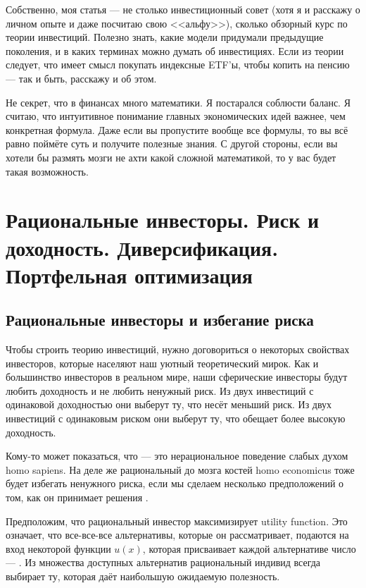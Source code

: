 Собственно, моя статья --- не столько инвестиционный совет (хотя я и расскажу о
личном опыте и даже посчитаю свою <<альфу>>), сколько обзорный курс по теории 
инвестиций. Полезно знать, какие модели придумали предыдущие поколения, и в 
каких терминах можно думать об инвестициях. Если из теории следует, что имеет 
смысл покупать индексные ETF'ы, чтобы копить на пенсию --- так и быть, расскажу 
и об этом.

Не секрет, что в финансах много математики. Я постарался соблюсти баланс. Я 
считаю, что интуитивное понимание главных экономических идей важнее, чем 
конкретная формула. Даже если вы пропустите вообще все формулы, то вы всё равно 
поймёте суть и получите полезные знания. С другой стороны, если вы хотели бы 
размять мозги не ахти какой сложной математикой, то у вас будет такая 
возможность.

\clearpage
\section{Рациональные инвесторы. Риск и доходность. Диверсификация. Портфельная
оптимизация}

\subsection{Рациональные инвесторы и избегание риска}

Чтобы строить теорию инвестиций, нужно договориться о некоторых свойствах 
инвесторов, которые населяют наш уютный теоретический мирок. Как и большинство 
инвесторов в реальном мире, наши сферические инвесторы будут любить доходность и 
не любить ненужный риск. Из двух инвестиций с одинаковой доходностью они выберут 
ту, что несёт меньший риск. Из двух инвестиций с одинаковым риском они выберут 
ту, что обещает более высокую доходность.

Кому-то может показаться, что  --- это
нерациональное поведение слабых духом homo sapiens. На деле же рациональный до
мозга костей homo economicus тоже будет избегать ненужного риска, если мы
сделаем несколько предположений о том, как он принимает решения
\cite[ch.~6.1]{bodie2014investments}.
 
Предположим, что рациональный инвестор максимизирует 
{utility function}. Это означает, что все-все-все альтернативы, которые он 
рассматривает, подаются на вход некоторой функции $u(x)$, которая присваивает
каждой альтернативе число --- . Из множества доступных 
альтернатив рациональный индивид всегда выбирает ту, которая даёт наибольшую
ожидаемую полезность.
 
